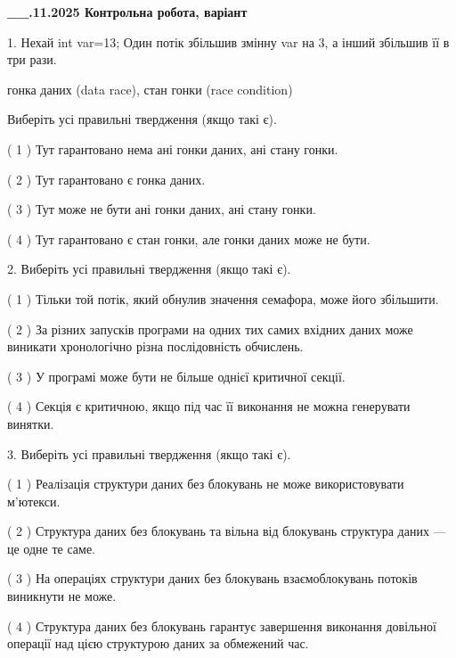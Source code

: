 \documentclass[12pt, ukrainian]{article}
\begin{document}
\newpage
\begin {large}

\textbf{\_\_.11.2025 Контрольна робота, варіант  }\par


{
1. Нехай int var=13; Один потік збільшив змінну var на 3, а інший збільшив її в три рази.

гонка даних (data race), стан гонки (race condition)

Виберіть усі правильні твердження (якщо такі є).\par
\vspace{2mm}
( 1 ) Тут гарантовано нема ані гонки даних, ані стану гонки.%

( 2 ) Тут гарантовано є гонка даних.%

( 3 ) Тут може не бути ані гонки даних, ані стану гонки.%

( 4 ) Тут гарантовано є стан гонки, але гонки даних може не бути.%


2. Виберіть усі правильні твердження (якщо такі є).\par
\vspace{2mm}

( 1 ) Тільки той потік, який обнулив значення семафора, може його збільшити.%

( 2 ) За різних запусків програми на одних тих самих вхідних даних може виникати хронологічно різна послідовність обчислень.%

( 3 ) У програмі може бути не більше однієї критичної секції.%

( 4 ) Секція є критичною, якщо під час її виконання не можна генерувати винятки.%


3. Виберіть усі правильні твердження (якщо такі є).\par
\vspace{2mm}

( 1 ) Реалізація структури даних без блокувань не може використовувати м’ютекси.%

( 2 ) Структура даних без блокувань та вільна від блокувань структура даних --- це одне те саме.%

( 3 ) На операціях структури даних без блокувань взаємоблокувань потоків виникнути не може.%

( 4 ) Структура даних без блокувань гарантує завершення виконання довільної операції над цією структурою даних за обмежений час.%


}
\end{large}
\end{document}
